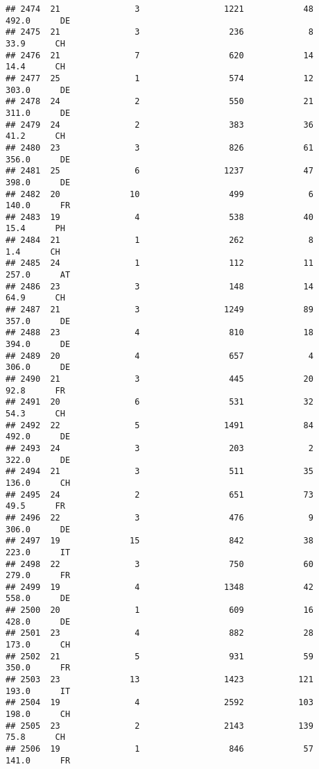 \documentclass[
]{article}
\begin{document}
\begin{verbatim}
## 2474  21               3                 1221            48    492.0      DE
## 2475  21               3                  236             8     33.9      CH
## 2476  21               7                  620            14     14.4      CH
## 2477  25               1                  574            12    303.0      DE
## 2478  24               2                  550            21    311.0      DE
## 2479  24               2                  383            36     41.2      CH
## 2480  23               3                  826            61    356.0      DE
## 2481  25               6                 1237            47    398.0      DE
## 2482  20              10                  499             6    140.0      FR
## 2483  19               4                  538            40     15.4      PH
## 2484  21               1                  262             8      1.4      CH
## 2485  24               1                  112            11    257.0      AT
## 2486  23               3                  148            14     64.9      CH
## 2487  21               3                 1249            89    357.0      DE
## 2488  23               4                  810            18    394.0      DE
## 2489  20               4                  657             4    306.0      DE
## 2490  21               3                  445            20     92.8      FR
## 2491  20               6                  531            32     54.3      CH
## 2492  22               5                 1491            84    492.0      DE
## 2493  24               3                  203             2    322.0      DE
## 2494  21               3                  511            35    136.0      CH
## 2495  24               2                  651            73     49.5      FR
## 2496  22               3                  476             9    306.0      DE
## 2497  19              15                  842            38    223.0      IT
## 2498  22               3                  750            60    279.0      FR
## 2499  19               4                 1348            42    558.0      DE
## 2500  20               1                  609            16    428.0      DE
## 2501  23               4                  882            28    173.0      CH
## 2502  21               5                  931            59    350.0      FR
## 2503  23              13                 1423           121    193.0      IT
## 2504  19               4                 2592           103    198.0      CH
## 2505  23               2                 2143           139     75.8      CH
## 2506  19               1                  846            57    141.0      FR

\end{verbatim}
\end{document}
